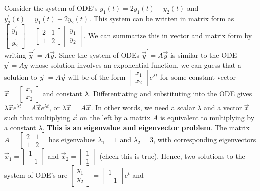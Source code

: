 \documentclass[10pt]{article}
\theoremstyle{plain}
\theoremstyle{box}
\begin{document}
Consider the system of ODE's $y_1^\prime(t)=2y_1(t)+y_2(t)$ and $y_2^\prime(t) = y_1(t)+2y_2(t)$.  This system can be written in matrix form as 
$
\begin{bmatrix}y_1^\prime\\y_2^\prime\end{bmatrix} 
= 
\begin{bmatrix}2&1\\1&2\end{bmatrix} 
\begin{bmatrix}y_1\\y_2\end{bmatrix}
$. 
We can summarize this in vector and matrix form by writing $\vec y^\prime =A\vec y$. 
Since the system of ODEs $\vec y^\prime =A\vec y$ is similar to the ODE $y^\prime=Ay$ whose solution involves an exponential function, we can guess that a solution to $\vec y^\prime =A\vec y$ will be of the form $\begin{bmatrix}x_1\\x_2\end{bmatrix}e^{\lambda t}$ for some constant vector $\vec x=\begin{bmatrix}x_1\\x_2\end{bmatrix}$ and constant $\lambda$.  
Differentiating and substituting into the ODE gives $\lambda \vec x e^{\lambda t}=A\vec x e^{\lambda t} $, or $\lambda \vec x =A\vec x $. In other words, we need a scalar $\lambda$ and a vector $\vec x$ such that multiplying $\vec x$ on the left by a matrix $A$ is equivalent to multiplying by a constant $\lambda$.  \textbf{This is an eigenvalue and eigenvector problem}. The matrix 
$A=\begin{bmatrix}2&1\\1&2\end{bmatrix}$ has eigenvalues $\lambda_1 = 1$ and $\lambda_2= 3$, with corresponding eigenvectors $\vec x_1=\begin{bmatrix}1\\-1\end{bmatrix}$ and $\vec x_2=\begin{bmatrix}1\\1\end{bmatrix}$ (check this is true). Hence, two solutions to the system of ODE's are 
$ \begin{bmatrix}y_1\\y_2\end{bmatrix} = \begin{bmatrix}1\\-1\end{bmatrix}e^t$ and 
\end{document}

